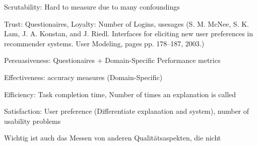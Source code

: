  Scrutability: Hard to measure due to many confoundings
 
 Trust: Questionaires, Loyalty: Number of Logins, usesages (S. M. McNee, S. K. Lam, J. A. Konstan, and J. Riedl. Interfaces for eliciting new user preferences in recommender systems. User Modeling, pages pp. 178–187, 2003.)
 
 Persuasiveness: Questionaires + Domain-Specific Performance metrics
 
 Effectiveness: accuracy measures (Domain-Specific) 
 
 Efficiency: Task completion time, Number of times an explanation is called
 
 Satisfaction: User preference (Differentiate explanation and system), number of usability problems
 
 Wichtig ist auch das Messen von anderen Qualitätsaspekten, die nicht 